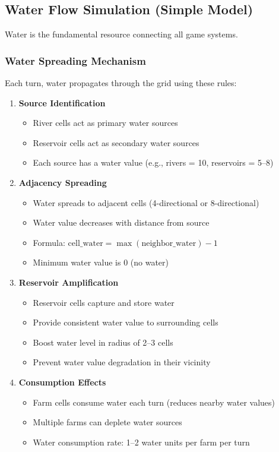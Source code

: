 \documentclass[12pt,a4paper]{article}
\begin{document}
\subsection{Water Flow Simulation (Simple Model)}

Water is the fundamental resource connecting all game systems.

\subsubsection{Water Spreading Mechanism}

Each turn, water propagates through the grid using these rules:

\begin{enumerate}
    \item \textbf{Source Identification}
    \begin{itemize}
        \item River cells act as primary water sources
        \item Reservoir cells act as secondary water sources
        \item Each source has a water value (e.g., rivers = 10, reservoirs = 5--8)
    \end{itemize}
    
    \item \textbf{Adjacency Spreading}
    \begin{itemize}
        \item Water spreads to adjacent cells (4-directional or 8-directional)
        \item Water value decreases with distance from source
        \item Formula: $ \text{cell\_water} = \max(\text{neighbor\_water}) - 1 $
        \item Minimum water value is 0 (no water)
    \end{itemize}
    
    \item \textbf{Reservoir Amplification}
    \begin{itemize}
        \item Reservoir cells capture and store water
        \item Provide consistent water value to surrounding cells
        \item Boost water level in radius of 2--3 cells
        \item Prevent water value degradation in their vicinity
    \end{itemize}
    
    \item \textbf{Consumption Effects}
    \begin{itemize}
        \item Farm cells consume water each turn (reduces nearby water values)
        \item Multiple farms can deplete water sources
        \item Water consumption rate: 1--2 water units per farm per turn
    \end{itemize}
\end{enumerate}
\end{document}
